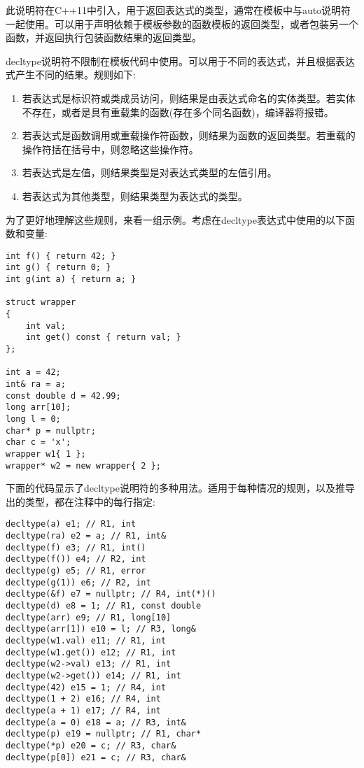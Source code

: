 此说明符在C++11中引入，用于返回表达式的类型，通常在模板中与auto说明符一起使用。可以用于声明依赖于模板参数的函数模板的返回类型，或者包装另一个函数，并返回执行包装函数结果的返回类型。

decltype说明符不限制在模板代码中使用。可以用于不同的表达式，并且根据表达式产生不同的结果。规则如下:

\begin{enumerate}
\item
若表达式是标识符或类成员访问，则结果是由表达式命名的实体类型。若实体不存在，或者是具有重载集的函数(存在多个同名函数)，编译器将报错。

\item
若表达式是函数调用或重载操作符函数，则结果为函数的返回类型。若重载的操作符括在括号中，则忽略这些操作符。

\item
若表达式是左值，则结果类型是对表达式类型的左值引用。

\item
若表达式为其他类型，则结果类型为表达式的类型。
\end{enumerate}

为了更好地理解这些规则，来看一组示例。考虑在decltype表达式中使用的以下函数和变量:

\begin{lstlisting}[style=styleCXX]
int f() { return 42; }
int g() { return 0; }
int g(int a) { return a; }

struct wrapper
{
	int val;
	int get() const { return val; }
};

int a = 42;
int& ra = a;
const double d = 42.99;
long arr[10];
long l = 0;
char* p = nullptr;
char c = 'x';
wrapper w1{ 1 };
wrapper* w2 = new wrapper{ 2 };
\end{lstlisting}

下面的代码显示了decltype说明符的多种用法。适用于每种情况的规则，以及推导出的类型，都在注释中的每行指定:

\begin{lstlisting}[style=styleCXX]
decltype(a) e1; // R1, int
decltype(ra) e2 = a; // R1, int&
decltype(f) e3; // R1, int()
decltype(f()) e4; // R2, int
decltype(g) e5; // R1, error
decltype(g(1)) e6; // R2, int
decltype(&f) e7 = nullptr; // R4, int(*)()
decltype(d) e8 = 1; // R1, const double
decltype(arr) e9; // R1, long[10]
decltype(arr[1]) e10 = l; // R3, long&
decltype(w1.val) e11; // R1, int
decltype(w1.get()) e12; // R1, int
decltype(w2->val) e13; // R1, int
decltype(w2->get()) e14; // R1, int
decltype(42) e15 = 1; // R4, int
decltype(1 + 2) e16; // R4, int
decltype(a + 1) e17; // R4, int
decltype(a = 0) e18 = a; // R3, int&
decltype(p) e19 = nullptr; // R1, char*
decltype(*p) e20 = c; // R3, char&
decltype(p[0]) e21 = c; // R3, char&
\end{lstlisting}

